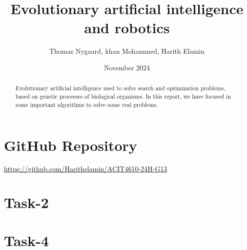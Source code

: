 \documentclass{article}
\begin{document}
\title{Evolutionary artificial intelligence and robotics}
\author{Thomas Nygaard, khan Mohammed, Harith Elamin}
\date{November 2024}

\maketitle
\begin{abstract}
      Evolutionary artificial intelligence used to solve search and optimization problems, based on genetic processes of biological organisms. In this report, we have focused in some important algorithms to solve some real problems.  
\end{abstract}

\section{GitHub Repository}
\faGithub{}
\hyperlink{target name}{https://github.com/Harithelamin/ACIT4610-24H-G13}



\section{Task-2}


\section{Task-4}


\printbibliography
\end{document}
